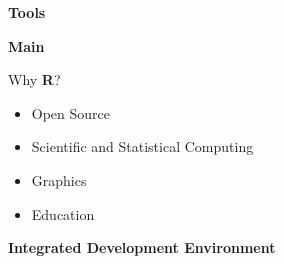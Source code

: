 \begin{frame} 
\begin{center}\textbf{\huge Tools}\end{center}
\end{frame}

\begin{frame}\textbf{Main}\vspace{0cm}
\begin{center}
\end{center}
Why \textbf{\textsf{R}}?\vspace{0.3cm}
\begin{itemize}
\item Open Source\vspace{0.2cm}
\item Scientific and Statistical Computing\vspace{0.2cm}
\item Graphics\vspace{0.2cm}
\item Education
\end{itemize}

\end{frame}



\begin{frame}\textbf{Integrated Development Environment}\vspace{1cm}
\begin{center}
\end{center}
\end{frame}

